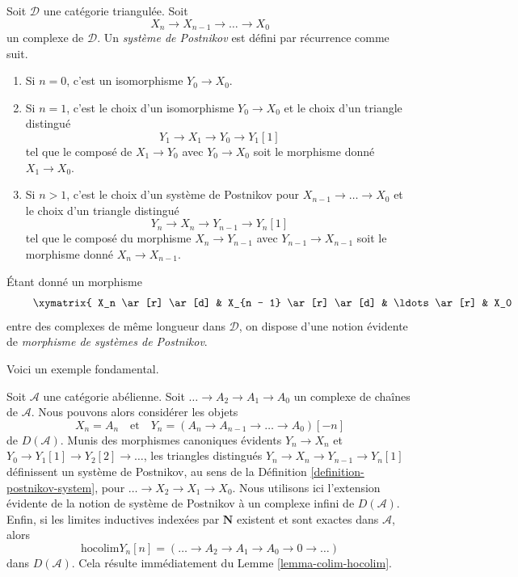 \begin{definition}
\label{definition-postnikov-system}
Soit $\mathcal{D}$ une catégorie triangulée. Soit
$$
X_n \to X_{n - 1} \to \ldots \to X_0
$$
un complexe de $\mathcal{D}$. Un {\it système de Postnikov} est défini
par récurrence comme suit.
\begin{enumerate}
\item Si $n = 0$, c'est un isomorphisme $Y_0 \to X_0$.
\item Si $n = 1$, c'est le choix d'un isomorphisme $Y_0 \to X_0$ et
le choix d'un triangle distingué
$$
Y_1 \to X_1 \to Y_0 \to Y_1[1]
$$
tel que le composé de $X_1 \to Y_0$ avec $Y_0 \to X_0$ soit le morphisme
donné $X_1 \to X_0$.
\item Si $n > 1$, c'est le choix d'un système de Postnikov
pour $X_{n - 1} \to \ldots \to X_0$ et le choix d'un triangle
distingué
$$
Y_n \to X_n \to Y_{n - 1} \to Y_n[1]
$$
tel que le composé du morphisme $X_n \to Y_{n - 1}$ avec
$Y_{n - 1} \to X_{n - 1}$ soit le morphisme donné
$X_n \to X_{n - 1}$.
\end{enumerate}
Étant donné un morphisme
\begin{equation}
\label{equation-map-complexes}
\vcenter{
\xymatrix{
X_n \ar[r] \ar[d] &
X_{n - 1} \ar[r] \ar[d] &
\ldots \ar[r] &
X_0 \ar[d] \\
X'_n \ar[r] &
X'_{n - 1} \ar[r] &
\ldots \ar[r] &
X'_0
}
}
\end{equation}
entre des complexes de même longueur dans $\mathcal{D}$,
on dispose d'une notion évidente de {\it morphisme de systèmes de Postnikov}.
\end{definition}

\noindent
Voici un exemple fondamental.

\begin{example}
\label{example-key-postnikov}
Soit $\mathcal{A}$ une catégorie abélienne. Soit
$\ldots \to A_2 \to A_1 \to A_0$ un complexe de chaînes de $\mathcal{A}$.
Nous pouvons alors considérer les objets
$$
X_n = A_n
\quad\text{et}\quad
Y_n = (A_n \to A_{n - 1} \to \ldots \to A_0)[-n]
$$
de $D(\mathcal{A})$. Munis des morphismes canoniques évidents
$Y_n \to X_n$ et
$Y_0 \to Y_1[1] \to Y_2[2] \to \ldots$, les triangles distingués
$Y_n \to X_n \to Y_{n - 1} \to Y_n[1]$ définissent un système de Postnikov,
au sens de la Définition \ref{definition-postnikov-system}, pour
$\ldots \to X_2 \to X_1 \to X_0$. Nous utilisons ici l'extension évidente
de la notion de système de Postnikov à un complexe infini de
$D(\mathcal{A})$. Enfin, si les limites inductives indexées par
$\mathbf{N}$ existent et sont exactes dans $\mathcal{A}$, alors
$$
\text{hocolim} Y_n[n] = (\ldots \to A_2 \to A_1 \to A_0 \to 0 \to \ldots)
$$
dans $D(\mathcal{A})$. Cela résulte immédiatement du
Lemme \ref{lemma-colim-hocolim}.
\end{example}

